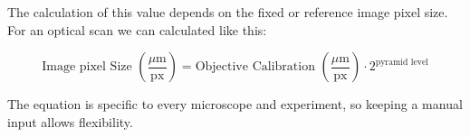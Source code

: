 	The calculation of this value depends on the fixed or reference image pixel size. For an optical scan we can calculated like this:
	
	\begin{equation}
		\text{Image pixel Size } \left( \frac{\mu\text{m}}{\text{px}} \right) = \text{Objective Calibration } \left( \frac{\mu\text{m}}{\text{px}} \right) \cdot 2^{\text{pyramid level}}
	\end{equation}
	
	The equation is specific to every microscope and experiment, so keeping a manual input allows flexibility.
	

